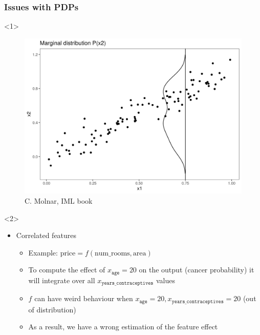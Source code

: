 \documentclass{beamer}
\begin{document}
\begin{frame}
  \frametitle{Issues with PDPs}
  \begin{onlyenv}<1>
    \begin{figure}
      \includegraphics[width=.6\textwidth]{./figures/aleplot-motivation1-1}
      \caption{\footnotesize C. Molnar, IML book}
    \end{figure}
  \end{onlyenv}
  \begin{onlyenv}<2>
    \begin{itemize}
    \item Correlated features
      \begin{itemize}
      \item Example: $\text{price} = f(\text{num\_rooms}, \text{area})$
      \item To compute the effect of \(x_{\mathtt{age}} = 20\) on the
        output (cancer probability) it will integrate over all
        \(x_{\mathtt{years\_contraceptives}}\) values
      \item \(f\) can have weird behaviour when
        \(x_{\mathtt{age}} = 20, x_{\mathtt{years\_contraceptives}}=
        20\) (out of distribution)
      \item As a result, we have a wrong estimation of the feature effect
      \end{itemize}
      \end{itemize}
  \end{onlyenv}
\end{frame}
\end{document}
